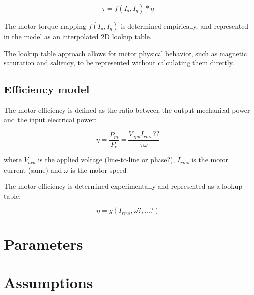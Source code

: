 \documentclass[]{article}
\begin{document}
		\begin{equation}
			\tau = f(I_d, I_q) * \eta
		\end{equation}
	
		The motor torque mapping $f(I_d, I_q)$ is determined empirically, and represented in the model as an interpolated 2D lookup table.
	
		The lookup table approach allows for motor physical behavior, such as magnetic saturation and saliency, to be represented without calculating them directly.
	\subsection{Efficiency model}
		The motor efficiency is defined as the ratio between the output mechanical power and the input electrical power:
		
		\begin{equation}
			\eta = \frac{P_m}{P_e} = \frac{V_{app} I_{rms} ??}{\tau \omega}
		\end{equation}
		
		where $V_{app}$ is the applied voltage (line-to-line or phase?), $I_{rms}$ is the motor current (same) and $\omega$ is the motor speed.
		
		The motor efficiency is determined experimentally and represented as a lookup table:
		
		\begin{equation}
			\eta = g(I_{rms}, \omega ?, ...? )
		\end{equation}

\section{Parameters}



\section{Assumptions}
\end{document}
